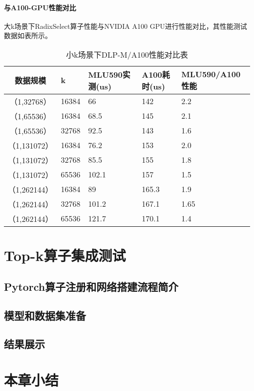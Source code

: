 \paragraph{与A100-GPU性能对比}
大k场景下RadixSelect算子性能与NVIDIA A100 GPU进行性能对比，其性能测试数据如表所示。
\begin{table}
    \centering
    \caption{小k场景下DLP-M/A100性能对比表}
    \begin{tabular}{cllll}
    \toprule
    数据规模 & k &   MLU590实测(us) & A100耗时(us) & MLU590/A100性能 \\
    \midrule
    （1,32768） & 16384   & 66 & 142 & 2.2 \\
    （1,65536） & 16384    & 68.5 & 145 & 2.1 \\
    （1,65536） & 32768   & 92.5 & 143 & 1.6 \\

    （1,131072） & 16384    & 76.2 & 153 & 2.0 \\
    （1,131072） & 32768   & 85.5 & 155 & 1.8 \\
    （1,131072） & 65536   & 102.1 & 157 & 1.5 \\
    
    （1,262144） & 16384   & 89 & 165.3 & 1.9 \\
    （1,262144） & 32768   & 101.2 & 167.1 & 1.65 \\
    （1,262144） & 65536   & 121.7 & 170.1 & 1.4 \\
    

    \bottomrule
    \end{tabular}
    \end{table}
   



\section{Top-k算子集成测试}
\subsection{Pytorch算子注册和网络搭建流程简介}

\subsection{模型和数据集准备}

\subsection{结果展示}
    







\section{本章小结}

